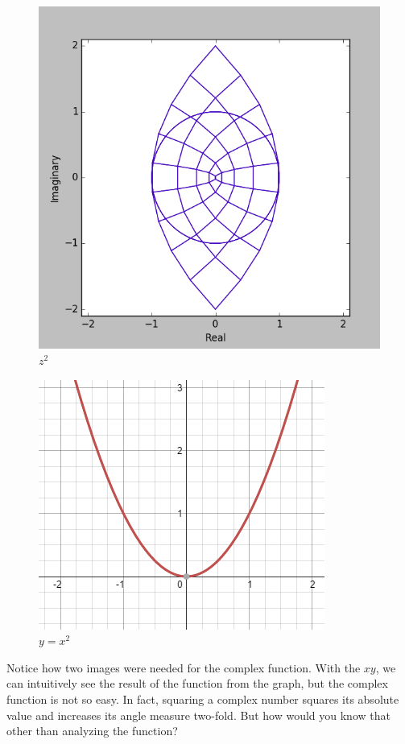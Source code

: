 \documentclass{article}
\begin{document}
    \begin{figure}[H]
        \centering
        \includegraphics[scale=.5]{z2}
        \caption{$z^{2}$}
        \label{fig:my_label}
    \end{figure}
    \begin{figure}[H]
        \centering
        \includegraphics[scale=.66]{x2}
        \caption{$y=x^{2}$}
        \label{fig:my_label}
    \end{figure}
    Notice how two images were needed for the complex function. With the $xy$, we can intuitively see the result of the function from the graph, but the complex function is not so easy. In fact, squaring a complex number squares its absolute value and increases its angle measure two-fold. But how would you know that other than analyzing the function?\\
\end{document}
